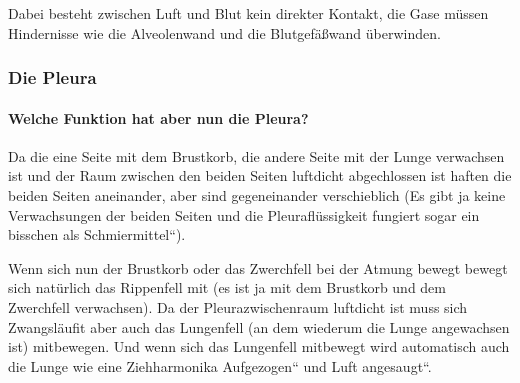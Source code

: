 Dabei besteht zwischen Luft und Blut kein direkter Kontakt, die Gase
m\"ussen Hindernisse wie die Alveolenwand und die Blutgef\"a{\ss}wand
\"uberwinden.  



\subsubsection{Die Pleura}

{}

\paragraph{Welche Funktion hat aber nun die Pleura?}

Da die eine Seite mit dem Brustkorb, die andere Seite mit der Lunge
verwachsen ist und der Raum zwischen den beiden Seiten luftdicht
abgechlossen ist haften die beiden Seiten aneinander, aber sind
gegeneinander verschieblich (Es gibt ja keine Verwachsungen der beiden
Seiten und die Pleurafl\"ussigkeit fungiert sogar ein
bisschen als {\quotedblbase}Schmiermittel{\textquotedblleft}). 

Wenn sich nun der Brustkorb oder das Zwerchfell bei der Atmung bewegt
bewegt sich nat\"urlich das Rippenfell mit (es ist ja mit dem Brustkorb
und dem Zwerchfell verwachsen). Da der Pleurazwischenraum luftdicht ist
muss sich Zwangsl\"aufit aber auch das Lungenfell (an dem wiederum die
Lunge angewachsen ist) mitbewegen. Und wenn sich das Lungenfell
mitbewegt wird automatisch auch die Lunge wie eine Ziehharmonika
{\quotedblbase}Aufgezogen{\textquotedblleft} und Luft
{\quotedblbase}angesaugt{\textquotedblleft}. 

